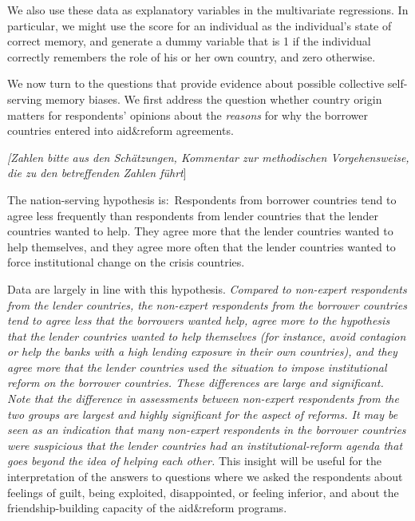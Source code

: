 We also use these data as explanatory variables in the multivariate
regressions. In particular, we might use the score for an individual as the
individual's state of correct memory, and generate a dummy variable that is
1 if the individual correctly remembers the role of his or her own country,
and zero otherwise. 

We now turn to the questions that provide evidence about possible collective
self-serving memory biases. We first address the question whether country
origin matters for respondents' opinions about the \textit{reasons} for why
the borrower countries entered into aid\&reform agreements. \textit{\ }

\emph{[Zahlen bitte aus den Sch\"{a}tzungen, Kommentar zur methodischen
Vorgehensweise, die zu den betreffenden Zahlen f\"{u}hrt}]

The nation-serving hypothesis is:\ Respondents from borrower countries tend
to agree less frequently than respondents from lender countries 
that the lender countries wanted to help. They agree more that
the lender countries wanted to help themselves, and they agree more 
often that the lender countries wanted to force institutional change on the
crisis countries.\textit{\ }

Data are largely in line with this hypothesis. \textit{Compared to
non-expert respondents from the lender countries, the non-expert respondents
from the borrower countries tend to agree less that the
borrowers wanted help, agree more to the hypothesis that the lender
countries wanted to help themselves (for instance, avoid contagion or help
the banks with a high lending exposure in their own countries), and they
agree more that the lender countries used the situation to
impose institutional reform on the borrower countries. These differences are
large and significant. Note that the difference in assessments between
non-expert respondents from the two groups are largest and highly
significant for the aspect of reforms. It may be seen as an indication that
many non-expert respondents in the borrower countries were suspicious that
the lender countries had an institutional-reform agenda that goes beyond the
idea of helping each other. }This insight will be useful for the
interpretation of the answers to questions where we asked the respondents
about feelings of guilt, being exploited, disappointed, or feeling inferior,
and about the friendship-building capacity of the aid\&reform programs.

